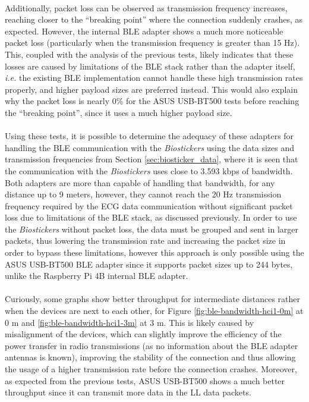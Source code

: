 \paragraph{} Additionally, packet loss can be observed as transmission frequency increases, reaching closer to the ``breaking point'' where the connection suddenly crashes, as expected. However, the internal \acs{BLE} adapter shows a much more noticeable packet loss (particularly when the transmission frequency is greater than 15 Hz). This, coupled with the analysis of the previous tests, likely indicates that these losses are caused by limitations of the \acs{BLE} stack rather than the adapter itself, \textit{i.e.} the existing \acs*{BLE} implementation cannot handle these high transmission rates properly, and higher payload sizes are preferred instead. This would also explain why the packet loss is nearly 0\% for the ASUS USB-BT500 tests before reaching the ``breaking point'', since it uses a much higher payload size.

\paragraph{} Using these tests, it is possible to determine the adequacy of these adapters for handling the \acs*{BLE} communication with the \textit{Biostickers} using the data sizes and transmission frequencies from Section \ref{sec:biosticker_data}, where it is seen that the communication with the \textit{Biostickers} uses close to 3.593 kbps of bandwidth. Both adapters are more than capable of handling that bandwidth, for any distance up to 9 meters, however, they cannot reach the 20 Hz transmission frequency required by the ECG data communication without significant packet loss due to limitations of the \acs{BLE} stack, as discussed previously. In order to use the \textit{Biostickers} without packet loss, the data must be grouped and sent in larger packets, thus lowering the transmission rate and increasing the packet size in order to bypass these limitations, however this approach is only possible using the ASUS USB-BT500 \acs{BLE} adapter since it supports packet sizes up to 244 bytes, unlike the Raspberry Pi 4B internal \acs{BLE} adapter.   

\paragraph{} Curiously, some graphs show better throughput for intermediate distances rather when the devices are next to each other,  for Figure \ref{fig:ble-bandwidth-hci1-0m} at 0 m and \ref{fig:ble-bandwidth-hci1-3m} at 3 m. This is likely caused by misalignment of the devices, which can slightly improve the efficiency of the power transfer in radio transmissions (as no information about the \acs{BLE} adapter antennas is known), improving the stability of the connection and thus allowing the usage of a higher transmission rate before the connection crashes. Moreover, as expected from the previous tests, ASUS USB-BT500 shows a much better throughput since it can transmit more data in the \acs{LL} data packets. 

